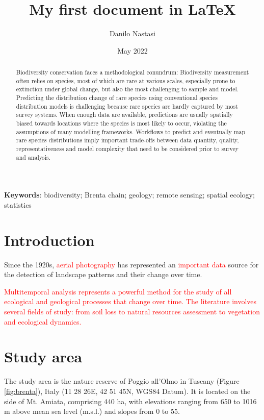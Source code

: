\documentclass[a4paper,12pt]{article}
\title{My first document in LaTeX}
\author{Danilo Nastasi}
\date{May 2022}
\newcommand{\tr}{\textcolor{red}}
\begin{document}
\maketitle
\tableofcontents


\begin{abstract}
    Biodiversity conservation faces a methodological conundrum: Biodiversity measurement often relies on species, most of which are rare at various scales, especially prone
to extinction under global change, but also the most challenging to sample and model.
Predicting the distribution change of rare species using conventional species distribution models is challenging because rare species are hardly captured by most survey
systems. When enough data are available, predictions are usually spatially biased towards locations where the species is most likely to occur, violating the assumptions of
many modelling frameworks. Workflows to predict and eventually map rare species
distributions imply important trade-­offs between data quantity, quality, representativeness and model complexity that need to be considered prior to survey and analysis.
\end{abstract}

\noindent \textbf{Keywords}: biodiversity; Brenta chain; geology; remote sensing; spatial ecology; statistics

\section{Introduction}\label{sec:intro}

Since the 1920s, \textcolor{red} {aerial photography} has represented an \tr{important data} source for the
detection of landscape patterns and their change over time.


\tr{Multitemporal analysis represents a powerful method for the study of all ecological and geological processes that change over time. The literature involves several fields of study: from soil loss to natural resources assessment to vegetation and ecological dynamics.}


\section{Study area}
The study area is the nature reserve of Poggio all’Olmo in Tuscany (Figure \ref{fig:brenta}), Italy (11 28 26E, 42 51 45N, WGS84 Datum). It is located on the side of Mt. Amiata,
comprising 440 ha, with elevations ranging from 650 to 1016 m above mean sea level (m.s.l.) and slopes from 0 to 55.
\end{document}
